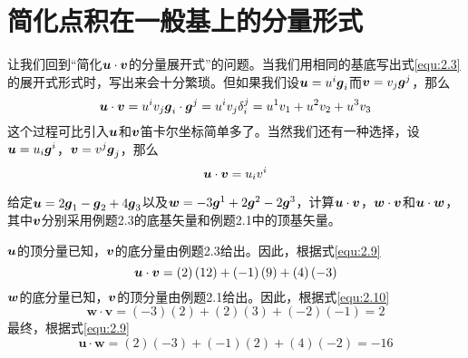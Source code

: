 \section{简化点积在一般基上的分量形式}

让我们回到“简化$\boldsymbol{u}\cdot \boldsymbol{v}$的分量展开式”的问题。当我们用相同的基底写出式\eqref{equ:2.3}的展开式形式时，写出来会十分繁琐。但如果我们设$\boldsymbol{u}=u^i\boldsymbol{g}_i$而$\boldsymbol{v}=v_j\boldsymbol{g}^j$，那么
\begin{equation}\label{equ:2.9}
    \boldsymbol{u}\cdot \boldsymbol{v}=u^iv_j\boldsymbol{g}_i\cdot \boldsymbol{g}^j=u^iv_j\delta _{i}^{j}=u^1v_1+u^2v_2+u^3v_3
\end{equation}
这个过程可比引入$\boldsymbol{u}$和$\boldsymbol{v}$笛卡尔坐标简单多了。当然我们还有一种选择，设$\boldsymbol{u}=u_i\boldsymbol{g}^i$，$\boldsymbol{v}=v^j\boldsymbol{g}_j$，那么
\begin{equation}\label{equ:2.10}
    \boldsymbol{u}\cdot \boldsymbol{v}=u_iv^i
\end{equation}

\begin{example}
    给定$\boldsymbol{u}=2\boldsymbol{g}_1-\boldsymbol{g}_2+4\boldsymbol{g}_3$以及$\boldsymbol{w}=-3\boldsymbol{g}^1+2\boldsymbol{g}^2-2\boldsymbol{g}^3$，计算$\boldsymbol{u}\cdot \boldsymbol{v}$，$\boldsymbol{w}\cdot \boldsymbol{v}$和$\boldsymbol{u}\cdot \boldsymbol{w}$，其中$\boldsymbol{v}$分别采用例题2.3的底基矢量和例题2.1中的顶基矢量。
\end{example}
\begin{solution}
    $\boldsymbol{u}$的顶分量已知，$\boldsymbol{v}$的底分量由例题2.3给出。因此，根据式\eqref{equ:2.9}
    \begin{equation*}
        \boldsymbol{u}\cdot \boldsymbol{v}=\left( 2 \right) \left( 12 \right) +\left( -1 \right) \left( 9 \right) +\left( 4 \right) \left( -3 \right) 
    \end{equation*}
    $\boldsymbol{w}$的底分量已知，$\boldsymbol{v}$的顶分量由例题2.1给出。因此，根据式\eqref{equ:2.10}
    \begin{equation*}
        \boldsymbol{w}\cdot \boldsymbol{v}=\left( -3 \right) \left( 2 \right) +\left( 2 \right) \left( 3 \right) +\left( -2 \right) \left( -1 \right) =2
    \end{equation*}
    最终，根据式\eqref{equ:2.9}
    \begin{equation*}
        \boldsymbol{u}\cdot \boldsymbol{w}=\left( 2 \right) \left( -3 \right) +\left( -1 \right) \left( 2 \right) +\left( 4 \right) \left( -2 \right) =-16
    \end{equation*}
\end{solution}